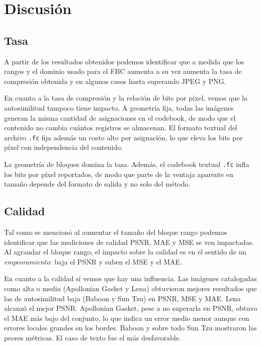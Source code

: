 
\section{Discusión}
\label{sec:discusion}

\subsection{Tasa}

A partir de los resultados obtenidos podemos identificar que a medida que los rangos y el dominio usado para el FBC aumenta a su vez aumenta la tasa de compresión obtenida y en algunos casos hasta superando JPEG y PNG.

En cuanto a la tasa de compresión y la relación de bits por píxel, vemos que la autosimilitud tampoco tiene impacto. A geometría fija, todas las imágenes generan la misma cantidad de asignaciones en el codebook, de modo que el contenido no cambia cuántos registros se almacenan. El formato textual del archivo \texttt{.fc} fija además un costo alto por asignación, lo que eleva los bits por píxel con independencia del contenido.

La geometría de bloques domina la tasa. Además, el codebook textual \texttt{.fc} infla los bits por píxel reportados, de modo que parte de la ventaja aparente en tamaño depende del formato de salida y no solo del método.

\subsection{Calidad}

Tal como se mencionó al aumentar el tamaño del bloque rango podemos identificar que las mediciones de calidad PSNR, MAE y MSE se ven impactadas. Al agrandar el bloque rango, el impacto sobre la calidad es en el sentido de un \emph{empeoramiento}: baja el PSNR y suben el MSE y el MAE.

En cuanto a la calidad sí vemos que hay una influencia. Las imágenes catalogadas como alta o media (Apollonian Gasket y Lena) obtuvieron mejores resultados que las de autosimilitud baja (Baboon y Sun Tzu) en PSNR, MSE y MAE. Lena alcanzó el mejor PSNR. Apollonian Gasket, pese a no superarla en PSNR, obtuvo el MAE más bajo del conjunto, lo que indica un error medio menor aunque con errores locales grandes en los bordes. Baboon y sobre todo Sun Tzu mostraron las peores métricas. El caso de texto fue el más desfavorable.

